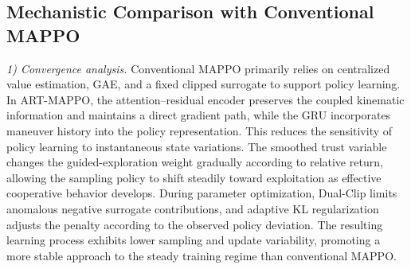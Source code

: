\documentclass[lettersize,journal]{IEEEtran}
\begin{document}



\subsection{Mechanistic Comparison with Conventional MAPPO}
\label{subsec:theory_comparison}

\emph{1) Convergence analysis.}
Conventional MAPPO primarily relies on centralized value estimation, GAE, and
a fixed clipped surrogate to support policy learning. In ART-MAPPO, the
attention--residual encoder preserves the coupled kinematic information and
maintains a direct gradient path, while the GRU incorporates maneuver history
into the policy representation. This reduces the sensitivity of policy learning
to instantaneous state variations. The smoothed trust variable changes the
guided-exploration weight gradually according to relative return, allowing the
sampling policy to shift steadily toward exploitation as effective cooperative
behavior develops. During parameter optimization, Dual-Clip limits anomalous
negative surrogate contributions, and adaptive KL regularization adjusts the
penalty according to the observed policy deviation. The resulting learning
process exhibits lower sampling and update variability, promoting a more stable
approach to the steady training regime than conventional MAPPO.
\end{document}
